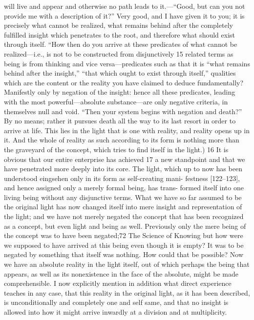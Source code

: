 will live and appear and otherwise no path leads to it.—“Good, but can you not
provide me with a description of it?” Very good, and I have given it to you; it
is precisely what cannot be realized, what remains behind after the completely
fulfilled insight which penetrates to the root, and therefore what should exist
through itself. “How then do you arrive at these predicates of what cannot be
realized—i.e., is not to be constructed from disjunctively 15 related terms as being
is from thinking and vice versa—predicates such as that it is “what remains
behind after the insight,” “that which ought to exist through itself,” qualities
which are the content or the reality you have claimed to deduce fundamentally?
Manifestly only by negation of the insight: hence all these predicates, leading
with the most powerful—absolute substance—are only negative criteria, in
themselves null and void. “Then your system begins with negation and death?”
By no means; rather it pursues death all the way to its last resort in order to
arrive at life. This lies in the light that is one with reality, and reality opens up
in it. And the whole of reality as such according to its form is nothing more
than the graveyard of the concept, which tries to find itself in the light.) 16
It is obvious that our entire enterprise has achieved 17 a new standpoint
and that we have penetrated more deeply into its core. The light, which up to
now has been understood {eingsehen} only in its form as self-creating mani-
festness [122–123], and hence assigned only a merely formal being, has trans-
formed itself into one living being without any disjunctive terms. What we
have so far assumed to be the original light has now changed itself into mere
insight and representation of the light; and we have not merely negated the
concept that has been recognized as a concept, but even light and being as
well. Previously only the mere being of the concept was to have been negated;72
The Science of Knowing
but how were we supposed to have arrived at this being even though it is
empty? It was to be negated by something that itself was nothing. How could
that be possible? Now we have an absolute reality in the light itself, out of
which perhaps the being that appears, as well as its nonexistence in the face of
the absolute, might be made comprehensible.
I now explicitly mention in addition what direct experience teaches in
any case, that this reality in the original light, as it has been described, is
unconditionally and completely one and self same, and that no insight is
allowed into how it might arrive inwardly at a division and at multiplicity.

